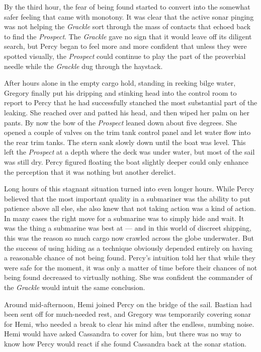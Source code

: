 \documentclass[
]{scrbook}
\begin{document}
By the third hour, the fear of being found started to convert into the
somewhat safer feeling that came with monotony. It was clear that the
active sonar pinging was not helping the \emph{Grackle} sort through the
mass of contacts that echoed back to find the \emph{Prospect}. The
\emph{Grackle} gave no sign that it would leave off its diligent search,
but Percy began to feel more and more confident that unless they were
spotted visually, the \emph{Prospect} could continue to play the part of
the proverbial needle while the \emph{Grackle} dug through the haystack.

After hours alone in the empty cargo hold, standing in reeking bilge
water, Gregory finally put his dripping and stinking head into the
control room to report to Percy that he had successfully stanched the
most substantial part of the leaking. She reached over and patted his
head, and then wiped her palm on her pants. By now the bow of the
\emph{Prospect} leaned down about five degrees. She opened a couple of
valves on the trim tank control panel and let water flow into the rear
trim tanks. The stern sank slowly down until the boat was level. This
left the \emph{Prospect} at a depth where the deck was under water, but
most of the sail was still dry. Percy figured floating the boat slightly
deeper could only enhance the perception that it was nothing but another
derelict.

Long hours of this stagnant situation turned into even longer hours.
While Percy believed that the most important quality in a submariner was
the ability to put patience above all else, she also knew that not
taking action was a kind of action. In many cases the right move for a
submarine was to simply hide and wait. It was the thing a submarine was
best at --- and in this world of discreet shipping, this was the reason
so much cargo now crawled across the globe underwater. But the success
of using hiding as a technique obviously depended entirely on having a
reasonable chance of not being found. Percy's intuition told her that
while they were safe for the moment, it was only a matter of time before
their chances of not being found decreased to virtually nothing. She was
confident the commander of the \emph{Grackle} would intuit the same
conclusion.

Around mid-afternoon, Hemi joined Percy on the bridge of the sail.
Bastian had been sent off for much-needed rest, and Gregory was
temporarily covering sonar for Hemi, who needed a break to clear his
mind after the endless, numbing noise. Hemi would have asked Cassandra
to cover for him, but there was no way to know how Percy would react if
she found Cassandra back at the sonar station.
\end{document}
